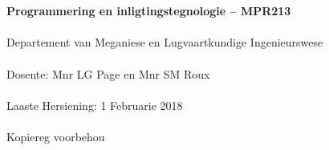 \begin{titlepage}
    \thispagestyle{empty}
    \\~\\[18cm]
    \large
    \textbf{Programmering en inligtingstegnologie -- MPR213} \\~\\
    Departement van Meganiese en Lugvaartkundige Ingenieurswese \\~\\[0.5cm]
    \normalsize
    Dosente: Mnr LG Page en  Mnr SM Roux \\~\\
    Laaste Hersiening: 1 Februarie 2018 \\~\\[0.5em]
    \textcopyright \quad Kopiereg voorbehou \\~\\
\end{titlepage}
\restoregeometry
